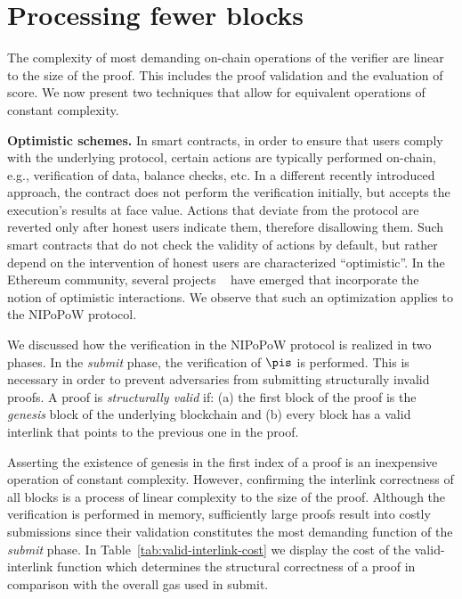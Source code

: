 \section{Processing fewer blocks}

The complexity of most demanding on-chain operations of the verifier are linear
to the size of the proof. This includes the proof validation and the evaluation
of score. We now present two techniques that allow for equivalent operations of
constant complexity.

\noindent \textbf{Optimistic schemes.} In smart contracts, in order to ensure that users
comply with the underlying protocol, certain actions are typically
performed on-chain, e.g., verification of data, balance checks, etc. In a
different recently introduced approach, the contract does not perform the
verification initially, but accepts the execution's results at face value.
Actions that deviate from the protocol are reverted only after
honest users indicate them, therefore disallowing them.
Such smart contracts that do not check the validity of actions by default, but
rather depend on the intervention of honest users are characterized
``optimistic''. In the Ethereum community, several projects ~\cite{piza,adler2019building,plasma,rollups-1,rollups-2} have emerged that incorporate the notion of
optimistic interactions. We observe that such an optimization applies to the
NIPoPoW protocol.

We discussed how the verification in the NIPoPoW protocol is realized in two
phases. In the \emph{submit} phase, the verification of $\pis$ is performed.
This is necessary in order to prevent adversaries from submitting structurally
invalid proofs. A proof is \emph{structurally valid} if:
(a) the first block of the proof is the
\emph{genesis} block of the underlying blockchain and
(b) every block has a valid
interlink that points to the previous one in the proof.

Asserting the existence of genesis in the first index of a proof is an
inexpensive operation of constant complexity. However, confirming the interlink
correctness of all blocks is a process of linear complexity to the size of the
proof. Although the verification is performed in memory, sufficiently large
proofs result into costly submissions since their validation constitutes the most
demanding function of the \emph{submit} phase. In
Table~\ref{tab:valid-interlink-cost} we display the cost of the
\textsf{valid-interlink} function which determines the structural correctness
of a proof in comparison with the overall gas used in \textsf{submit}.

